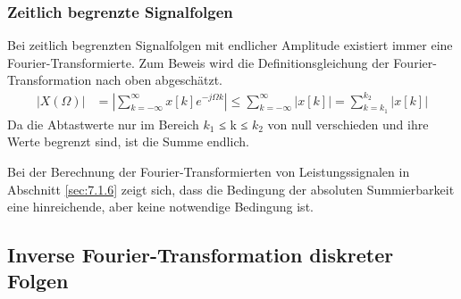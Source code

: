 \subsubsection{Zeitlich begrenzte Signalfolgen}\label{sec:zeitlich-begrenzte-signalfolgen}

Bei zeitlich begrenzten Signalfolgen mit endlicher Amplitude existiert immer eine Fourier-Transformierte. Zum Beweis wird die Definitionsgleichung der Fourier-Transformation nach oben abgeschätzt.
\begin{align}
\left| X(\Omega) \right| &= \left| \sum\limits_{k = - \infty}^{\infty}{x[ k]  e^{- j  \Omega  k}} \right| \leq \sum\limits_{k = - \infty}^{\infty}\left| x[ k] \right| = \sum\limits_{k = k_{1}}^{k_{2}}\left| x[ k] \right| \label{eq:7.34}
\end{align}
Da die Abtastwerte nur im Bereich \(k_{1}\) ≤ k ≤ \(k_{2}\) von null verschieden und ihre Werte begrenzt sind, ist die Summe endlich.

Bei der Berechnung der Fourier-Transformierten von Leistungssignalen in Abschnitt \ref{sec:7.1.6} zeigt sich, dass die Bedingung der absoluten Summierbarkeit eine hinreichende, aber keine notwendige Bedingung ist.

\subsection{Inverse Fourier-Transformation diskreter Folgen}\label{sec:inverse-fourier-transformation-diskreter-folgen}

